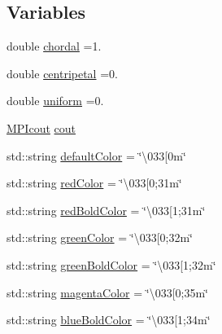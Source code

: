 \subsection*{Variables}
\begin{DoxyCompactItemize}
\item 
double \hyperlink{namespacemodel_ab92decb86519dc87869e1939eda61a31}{chordal} =1.
\item 
double \hyperlink{namespacemodel_a8934c473697d78a4cd48ee1e7e9532e9}{centripetal} =0.
\item 
double \hyperlink{namespacemodel_adf356cd2629d2de9a5a14ceace67cd94}{uniform} =0.
\item 
\hyperlink{structmodel_1_1_m_p_icout}{M\+P\+Icout} \hyperlink{namespacemodel_a0ce25fef078a7d9d9cb7cfbabcfbc289}{cout}
\item 
std\+::string \hyperlink{namespacemodel_ad88eee7a3e334a4d2f9f676d077527b6}{default\+Color} = \char`\"{}\textbackslash{}033\mbox{[}0m\char`\"{}
\item 
std\+::string \hyperlink{namespacemodel_a0b43b229c333feec93e0cdbdbed82373}{red\+Color} = \char`\"{}\textbackslash{}033\mbox{[}0;31m\char`\"{}
\item 
std\+::string \hyperlink{namespacemodel_a1f95d0545b18bbe40e02a8e2dbb83899}{red\+Bold\+Color} = \char`\"{}\textbackslash{}033\mbox{[}1;31m\char`\"{}
\item 
std\+::string \hyperlink{namespacemodel_abb69004d56ef9c3108f1bda2bb914ae9}{green\+Color} = \char`\"{}\textbackslash{}033\mbox{[}0;32m\char`\"{}
\item 
std\+::string \hyperlink{namespacemodel_ac930beb7c72e614bae7e16edd2a1738a}{green\+Bold\+Color} = \char`\"{}\textbackslash{}033\mbox{[}1;32m\char`\"{}
\item 
std\+::string \hyperlink{namespacemodel_a541f216e01462d19014e8782acb152cb}{magenta\+Color} = \char`\"{}\textbackslash{}033\mbox{[}0;35m\char`\"{}
\item 
std\+::string \hyperlink{namespacemodel_ae7217229d399815f042c45d4b589b768}{blue\+Bold\+Color} = \char`\"{}\textbackslash{}033\mbox{[}1;34m\char`\"{}
\end{DoxyCompactItemize}



